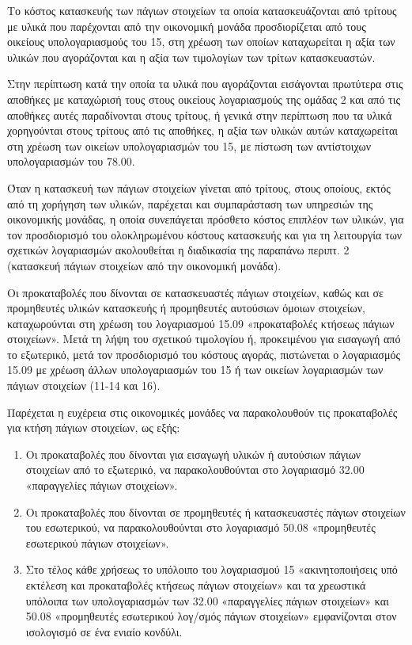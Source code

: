 \documentclass[A4,10pt,greek]{book}
\begin{document}
Το κόστος κατασκευής των πάγιων στοιχείων τα οποία κατασκευάζονται από τρίτους με υλικά που παρέχονται από την οικονομική μονάδα προσδιορίζεται από τους οικείους υπολογαριασμούς του 15, στη χρέωση των οποίων καταχωρείται η αξία των υλικών που αγοράζονται και η αξία των τιμολογίων των τρίτων κατασκευαστών.

Στην περίπτωση κατά την οποία τα υλικά που αγοράζονται εισάγονται πρωτύτερα στις αποθήκες με καταχώρισή τους στους οικείους λογαριασμούς της ομάδας 2 και από τις αποθήκες αυτές παραδίνονται στους τρίτους, ή γενικά στην περίπτωση που τα υλικά χορηγούνται στους τρίτους από τις αποθήκες, η αξία των υλικών αυτών καταχωρείται στη χρέωση των οικείων υπολογαριασμών του 15, με πίστωση των αντίστοιχων υπολογαριασμών του 78.00.

Όταν η κατασκευή των πάγιων στοιχείων γίνεται από τρίτους, στους οποίους, εκτός από τη χορήγηση των υλικών, παρέχεται και συμπαράσταση των υπηρεσιών της οικονομικής μονάδας, η οποία συνεπάγεται πρόσθετο κόστος επιπλέον των υλικών, για τον προσδιορισμό του ολοκληρωμένου κόστους κατασκευής και για τη λειτουργία των σχετικών λογαριασμών ακολουθείται η διαδικασία της παραπάνω περιπτ. 2 (κατασκευή πάγιων στοιχείων από την οικονομική μονάδα).

Οι προκαταβολές που δίνονται σε κατασκευαστές πάγιων στοιχείων, καθώς και σε προμηθευτές υλικών κατασκευής ή προμηθευτές αυτούσιων όμοιων στοιχείων, καταχωρούνται στη χρέωση του λογαριασμού 15.09 «προκαταβολές κτήσεως πάγιων στοιχείων». Μετά τη λήψη του σχετικού τιμολογίου ή, προκειμένου για εισαγωγή από το εξωτερικό, μετά τον προσδιορισμό του κόστους αγοράς, πιστώνεται ο λογαριασμός 15.09 με χρέωση άλλων υπολογαριασμών του 15 ή των οικείων λογαριασμών των πάγιων στοιχείων (11-14 και 16).

Παρέχεται η ευχέρεια στις οικονομικές μονάδες να παρακολουθούν τις προκαταβολές για κτήση πάγιων στοιχείων, ως εξής:

\begin{enumerate}

\item Οι προκαταβολές που δίνονται για εισαγωγή υλικών ή αυτούσιων πάγιων στοιχείων από το εξωτερικό, να παρακολουθούνται στο λογαριασμό 32.00 «παραγγελίες πάγιων στοιχείων».

\item Οι προκαταβολές που δίνονται σε προμηθευτές ή κατασκευαστές πάγιων στοιχείων του εσωτερικού, να παρακολουθούνται στο λογαριασμό 50.08 «προμηθευτές εσωτερικού πάγιων στοιχείων».

\item Στο τέλος κάθε χρήσεως το υπόλοιπο του λογαριασμού 15 «ακινητοποιήσεις υπό εκτέλεση και προκαταβολές κτήσεως πάγιων στοιχείων» και τα χρεωστικά υπόλοιπα των υπολογαριασμών των 32.00 «παραγγελίες πάγιων στοιχείων» και 50.08 «προμηθευτές εσωτερικού λογ/σμός πάγιων στοιχείων» εμφανίζονται στον ισολογισμό σε ένα ενιαίο κονδύλι.

\end{enumerate}
\end{document}
